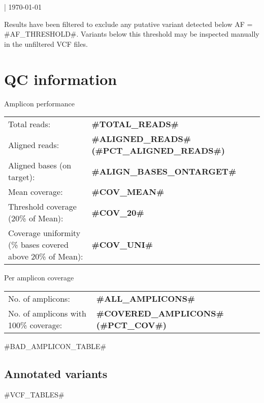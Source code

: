 \documentclass[11pt]{article}
\newcommand{\lightfont}{\fontseries{l}\selectfont}
\newcommand{\mediumfont}{\fontseries{m}\selectfont}
\renewcommand{\arraystretch}{1.5}
\begin{document}
\noindent
{\fontsize{16pt}{16pt}\selectfont {}}

\medskip
\noindent
{\lightfont {#PANEL#} | \today}

\medskip
\noindent Results have been filtered to exclude any putative variant detected below AF = {{#AF_THRESHOLD#}}. Variants below this threshold may be inspected manually in the unfiltered VCF files.

\section{QC information}

\begin{multicols}{2}
\noindent
{\color{darkblue1} \fontsize{14pt}{14pt}\selectfont Amplicon performance}\\

\noindent
\lightfont
{}
\begin{tabularx}{\columnwidth}{X l}

Total reads: & \textbf{{#TOTAL_READS#}} \\
Aligned reads: & \textbf{{#ALIGNED_READS#}} \textbf{({#PCT_ALIGNED_READS#})} \\
Aligned bases (on target):& \textbf{{#ALIGN_BASES_ONTARGET#}} \\
Mean coverage:& \textbf{{#COV_MEAN#}} \\
Threshold coverage (20\% of Mean): & \textbf{{#COV_20#}} \\
Coverage uniformity (\% bases covered above 20\% of Mean): & \textbf{{#COV_UNI#}}  \\
\end{tabularx}

\columnbreak

\noindent
\mediumfont
{\color{darkblue1} \fontsize{14pt}{14pt}\selectfont  Per amplicon coverage}\\

\noindent
\lightfont
{}
\begin{tabularx}{\columnwidth}{X l}

No. of amplicons:& \textbf{{{#ALL_AMPLICONS#}}} \\
No. of amplicons with 100\% coverage:& \textbf{{#COVERED_AMPLICONS#} ({#PCT_COV#})} \\
\end{tabularx}
\end{multicols}


{#BAD_AMPLICON_TABLE#}

\newpage
{}
\setlength{\headsep}{0.5cm}

\begin{landscape}
\renewcommand{\arraystretch}{1.4}
    \section{Annotated variants}
    \footnotesize
    {#VCF_TABLES#}
\end{landscape}
\end{document}
